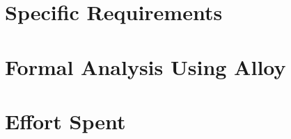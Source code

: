 \documentclass{Configuration_Files/PoliMi3i_project}
\begin{document}
    \clearpage
    {{\chapter{Specific Requirements}}}
    \label{sect:requirements}
    
    
    \clearpage
    {{\chapter{Formal Analysis Using Alloy}}}
    \label{sect:alloy}
    
    
    \clearpage
    \chapter{Effort Spent}
    \label{sect:effort}
    
    
    
    
    
    
    
    
\end{document}
